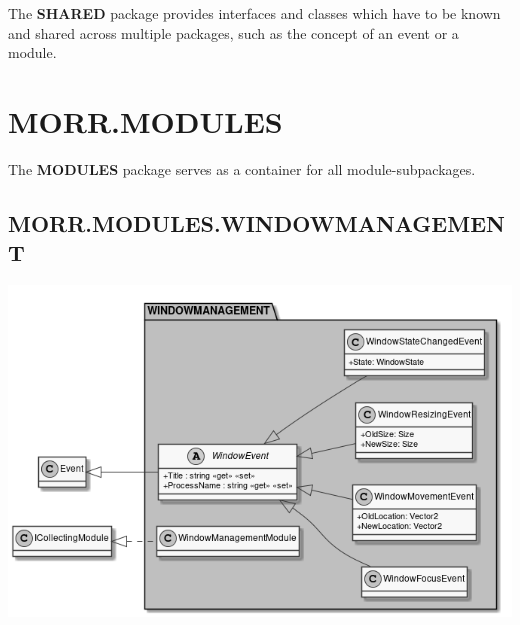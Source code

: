 The \textbf{SHARED} package provides interfaces and classes which have to be known and shared across multiple packages, such as the concept of an event or a module.

\begin{packif}
\end{packif}

\begin{packclass}
\end{packclass}

\newpage
\section{MORR.MODULES}

The \textbf{MODULES} package serves as a container for all module-subpackages.

\begin{packpack}
\end{packpack}

\subsection*{MORR.MODULES.WINDOWMANAGEMENT}

\begin{center}
    \includegraphics[width=1.0\textwidth]{resources/Packages/MODULES_WINDOWMANAGEMENT.png}
\end{center}


